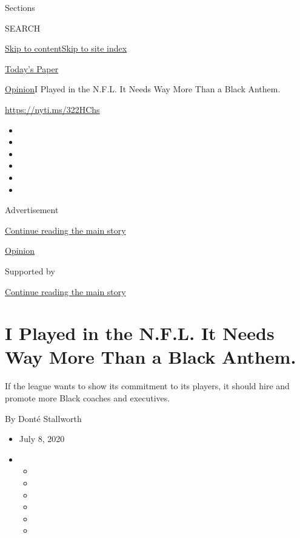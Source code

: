 Sections

SEARCH

\protect\hyperlink{site-content}{Skip to
content}\protect\hyperlink{site-index}{Skip to site index}

\href{https://myaccount.nytimes3xbfgragh.onion/auth/login?response_type=cookie\&client_id=vi}{}

\href{https://www.nytimes3xbfgragh.onion/section/todayspaper}{Today's
Paper}

\href{/section/opinion}{Opinion}\textbar{}I Played in the N.F.L. It
Needs Way More Than a Black Anthem.

\url{https://nyti.ms/322HChs}

\begin{itemize}
\item
\item
\item
\item
\item
\item
\end{itemize}

Advertisement

\protect\hyperlink{after-top}{Continue reading the main story}

\href{/section/opinion}{Opinion}

Supported by

\protect\hyperlink{after-sponsor}{Continue reading the main story}

\hypertarget{i-played-in-the-nfl-it-needs-way-more-than-a-black-anthem}{%
\section{I Played in the N.F.L. It Needs Way More Than a Black
Anthem.}\label{i-played-in-the-nfl-it-needs-way-more-than-a-black-anthem}}

If the league wants to show its commitment to its players, it should
hire and promote more Black coaches and executives.

By Donté Stallworth

\begin{itemize}
\item
  July 8, 2020
\item
  \begin{itemize}
  \item
  \item
  \item
  \item
  \item
  \item
  \end{itemize}
\end{itemize}

